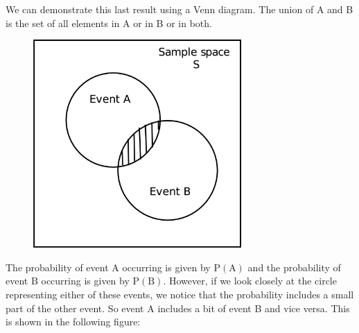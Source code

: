       
\label{m39377*eip-41}We can demonstrate this last result using a Venn diagram. The union of A and B is the set of all elements in A or in B or in both.

    \setcounter{subfigure}{0}


	\begin{figure}[H] %
    \begin{center}
    \label{m39377*uid743!!!underscore!!!media}\label{m39377*uid743!!!underscore!!!printimage}\includegraphics[width=300px]{col11306.imgs/m39377_venn1.png} %
        
      \vspace{2pt}
    \vspace{.1in}
    
    \end{center}

 \end{figure}   

    \addtocounter{footnote}{-0}
    
\par \label{m39377*eip-227}The probability of event A occurring is given by \begin{math}\mathrm{P\left(A\right)}\end{math} and the probability of event B occurring is given by \begin{math}\mathrm{P\left(B\right)}\end{math}. However, if we look closely at the circle representing either of these events, we notice that the probability includes a small part of the other event. So event A includes a bit of event B and vice versa. This is shown in the following figure:

    \setcounter{subfigure}{0}


